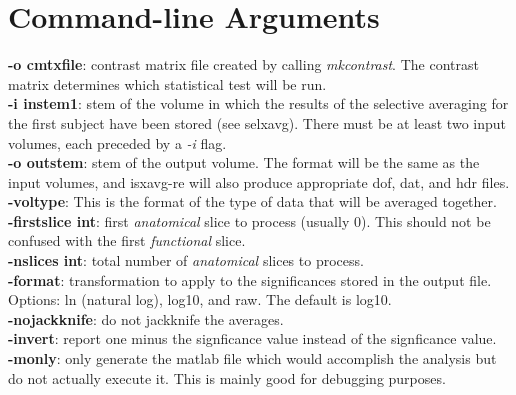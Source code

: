 \documentclass[10pt]{article}
\begin{document}
\section{Command-line Arguments}

\noindent
{\bf -o cmtxfile}: contrast matrix file created by calling {\em
mkcontrast}.  The contrast matrix determines which statistical test
will be run.\\

\noindent
{\bf -i instem1}: stem of the volume in which the results of the
selective averaging for the first subject have been stored (see
selxavg).  There must be at least two input volumes, each preceded by
a {\em -i} flag.\\

\noindent
{\bf -o outstem}: stem of the output volume.  The format will be the
same as the input volumes, and isxavg-re will also produce appropriate
dof, dat, and hdr files.\\

\noindent
{\bf -voltype}: This is the format of the type of data that will be
averaged together.\\

\noindent
{\bf -firstslice int}: first {\em anatomical} slice to process (usually 0).
This should not be confused with the first {\em functional} slice.\\

\noindent
{\bf -nslices int}: total number of {\em anatomical} slices to process.\\

\noindent
{\bf -format}: transformation to apply to the significances stored in
the output file. Options: ln (natural log), log10, and raw. The
default is log10.\\

\noindent
{\bf -nojackknife}: do not jackknife the averages.\\

\noindent
{\bf -invert}: report one minus the signficance value instead of the
signficance value. \\

\noindent
{\bf -monly}: only generate the matlab file which would accomplish the
analysis but do not actually execute it.  This is mainly good for
debugging purposes.\\
\end{document}
